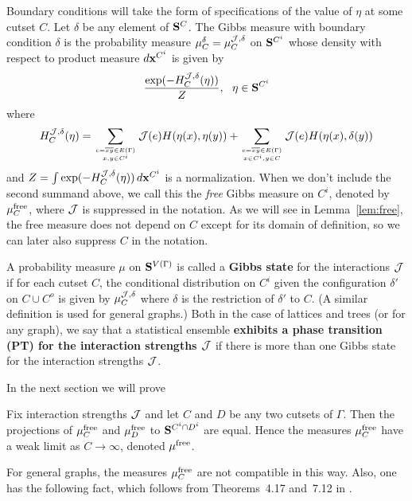 Boundary conditions will take the form of specifications of the
value of $\eta$ at some cutset $C$. 
Let $\delta$ be any element of $\S^C$.  The Gibbs measure with boundary
condition $\delta$ is the probability 
measure $\mu^\delta_C = \mu^{\J , \delta}_C$ on $\S^{C^i}$
whose density with respect to product measure $\dx^{C^i}$ is given by
\begin{equation} \label{eq:Gibbs}
{ \exp (- H^{\J , \delta}_C (\eta)) \over Z},\,\,\,\, \eta\in \S^{C^i} 
\end{equation}
where
$$ H^{\J , \delta}_C (\eta) = \sum_{e = \overline{xy} \in E(\Gamma) 
   \atop x,y \in C^i} \J (e) H(\eta (x) , \eta (y)) 
   + \sum_{e = \overline{xy} \in E(\Gamma) \atop x \in C^i, y \in C} 
   \J (e) H(\eta (x) , \delta (y)) $$
and 
$Z = \int \exp (- H^{\J , \delta}_C (\eta)) \, \dx^{C^i}$ is a normalization. 
When we don't include the second summand above, 
we call this the {\it free} Gibbs measure on $C^i$, denoted by $\mufree_C$,
where $\J$ is suppressed in the notation.
As we will see in Lemma~\ref{lem:free}, the free measure 
does not depend on $C$ except for its domain of definition, 
so we can later also suppress $C$ in the notation.

\begin{defn} \label{defn:gibbstree}
A probability measure $\mu$ on $\S^{V(\Gamma)}$ is called a {\bf Gibbs state} 
for the interactions $\J$ if for each cutset $C$, the 
conditional distribution on  $C^i$ given the configuration $\delta'$ 
on $C\cup C^o$  is given by $\mu_C^{\J , \delta}$ where $\delta$ 
is the restriction of $\delta'$ to $C$. (A similar definition is used for
general graphs.)
Both in the case of lattices and trees (or for any graph), we say that
a statistical ensemble {\bf exhibits a phase transition (PT) for the
interaction strengths $\J$} if there is more than one Gibbs state
for the interaction strengths $\J$.
\end{defn}

In the next section we will prove
\begin{lem} \label{lem:free}
Fix interaction strengths $\J$ and let 
$C$ and $D$ be any two cutsets of $\Gamma$.  Then the projections
of $\mufree_C$ and $\mufree_D$ to $\S^{C^i \cap D^i}$ are equal. Hence the 
measures $\mufree_C$ have a weak limit as $C \rightarrow \infty$,
denoted $\mufree$.
\end{lem}

For general graphs, the measures $\mufree_C$ are not compatible 
in this way. Also, one has the following fact, which follows from 
Theorems~4.17 and~7.12 in \cite{Ge}.


